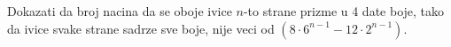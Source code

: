 \problem
Dokazati da broj nacina da se oboje ivice $n$-to strane prizme u 4 date boje,
tako da ivice svake strane sadrze sve boje, nije veci od
$(8 \cdot 6^{n-1} - 12 \cdot 2^{n-1})$.
\solution
\endproblem
